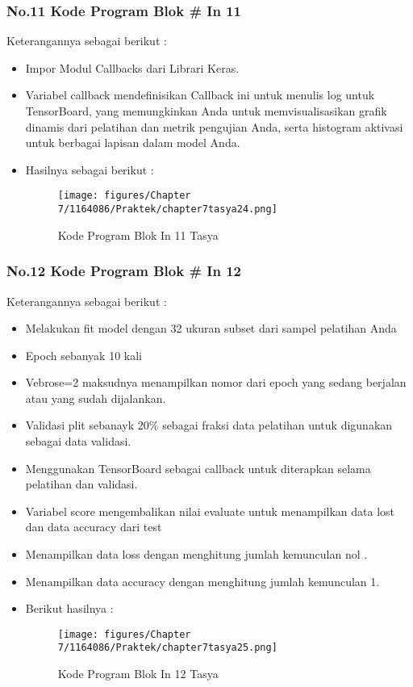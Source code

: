 \subsubsection{No.11 Kode Program Blok \# In 11}

Keterangannya sebagai berikut :
\begin{itemize}
\item Impor Modul Callbacks dari Librari Keras.
\item Variabel callback mendefinisikan Callback ini untuk menulis log untuk TensorBoard, yang memungkinkan Anda untuk memvisualisasikan grafik dinamis dari pelatihan dan metrik pengujian Anda, serta histogram aktivasi untuk berbagai lapisan dalam model Anda.
\item Hasilnya sebagai berikut : 
\begin{figure}[ht]
\centering
\texttt{[image: figures/Chapter 7/1164086/Praktek/chapter7tasya24.png]}
\caption{Kode Program Blok In 11 Tasya}
\label{Praktek}
\end{figure}
\end{itemize}

\subsubsection{No.12 Kode Program Blok \# In 12}

Keterangannya sebagai berikut :
\begin{itemize}
\item Melakukan fit model dengan 32 ukuran subset dari sampel pelatihan Anda
\item Epoch sebanyak 10 kali
\item Vebrose=2 maksudnya menampilkan nomor dari epoch yang sedang berjalan atau yang sudah dijalankan.
\item Validasi plit sebanayk 20\% sebagai fraksi data pelatihan untuk digunakan sebagai data validasi.
\item Menggunakan TensorBoard sebagai callback untuk diterapkan selama pelatihan dan validasi.
\item Variabel score mengembalikan nilai evaluate untuk menampilkan data lost dan data accuracy dari test
\item Menampilkan data loss dengan menghitung jumlah kemunculan nol .
\item Menampilkan data accuracy dengan menghitung jumlah kemunculan 1.
\item Berikut hasilnya :
\begin{figure}[ht]
\centering
\texttt{[image: figures/Chapter 7/1164086/Praktek/chapter7tasya25.png]}
\caption{Kode Program Blok In 12 Tasya}
\label{Praktek}
\end{figure}
\end{itemize}

